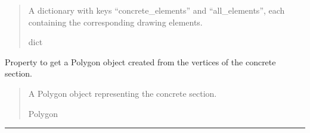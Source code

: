\documentclass[a4paper,10pt,english]{sphinxmanual}
\begin{document}
\begin{fulllineitems}
\begin{fulllineitems}
\begin{quote}
\begin{description}
\sphinxAtStartPar
A dictionary with keys “concrete\_elements” and “all\_elements”, each containing the corresponding drawing
elements.

\sphinxAtStartPar
dict

\end{description}\end{quote}

\end{fulllineitems}


\begin{fulllineitems}
\label{\detokenize{API:etacad.concrete.Concrete.polygon}}
\pysigstartsignatures
{}
\pysigstopsignatures
\sphinxAtStartPar
Property to get a Polygon object created from the vertices of the concrete section.
\begin{quote}\begin{description}
\sphinxAtStartPar
A Polygon object representing the concrete section.

\sphinxAtStartPar
Polygon

\end{description}\end{quote}

\end{fulllineitems}


\end{fulllineitems}



\bigskip\hrule\bigskip

\label{\detokenize{API:module-etacad.beam}}
\end{document}
